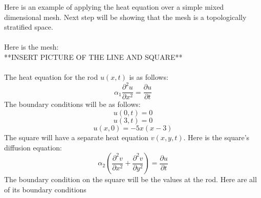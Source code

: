 \documentclass[twoside,11pt]{article}
\theoremstyle{definition}
\begin{document}
Here is an example of applying the heat equation over a simple mixed dimensional mesh. Next step will be showing that the mesh is a topologically stratified space. \\
\\
Here is the mesh:\\
**INSERT PICTURE OF THE LINE AND SQUARE**\\
\\
The heat equation for the rod $u(x,t)$ is as follows:
\[
\alpha_1 \frac{\partial^2 u}{\partial x^2} = \frac{\partial u}{\partial t}
\]
The boundary conditions will be as follows:
\[
u(0,t)=0
\]
\[
u(3,t)=0
\]
\[
u(x,0)=-5x(x-3)
\]
The square will have a separate heat equation $v(x,y,t)$. Here is the square's diffusion equation:
\[
\alpha_2 (\frac{\partial^2 v}{\partial x^2} + \frac{\partial^2 v}{\partial y^2}) = \frac{\partial u}{\partial t}
\]
The boundary condition on the square will be the values at the rod. Here are all of its boundary conditions
\end{document}

